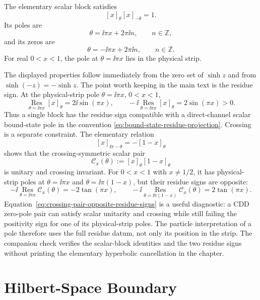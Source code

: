 \begin{remark}
\label{rem:elementary-scalar-block-algebra}
The elementary scalar block satisfies
\[
  [x]_{\theta}[x]_{-\theta}=1.
\]
Its poles are
\[
  \theta=\ii\pi x+2\pi\ii n,\qquad n\in\mathbb Z,
\]
and its zeros are
\[
  \theta=-\ii\pi x+2\pi\ii n,\qquad n\in\mathbb Z .
\]
For real \(0<x<1\), the pole at \(\theta=\ii\pi x\) lies in the physical
strip.
\end{remark}

The displayed properties follow immediately from the zero set of
\(\sinh z\) and from \(\sinh(-z)=-\sinh z\).  The point worth keeping in the
main text is the residue sign.  At the physical-strip pole
\(\theta=\ii\pi x\), \(0<x<1\),
\[
  \operatorname*{Res}_{\theta=\ii\pi x}[x]_\theta
  =
  2\ii\sin(\pi x),
  \qquad
  -\ii\operatorname*{Res}_{\theta=\ii\pi x}[x]_\theta
  =
  2\sin(\pi x)>0 .
\]
Thus a single block has the residue sign compatible with a direct-channel
scalar bound-state pole in the convention
\eqref{eq:bound-state-residue-projection}.  Crossing is a separate
constraint.  The elementary relation
\[
  [x]_{\ii\pi-\theta}=-[1-x]_\theta
\]
shows that the crossing-symmetric scalar pair
\[
  \mathcal C_x(\theta):=[x]_\theta[1-x]_\theta
\]
is unitary and crossing invariant.  For \(0<x<1\) with \(x\ne1/2\), it has
physical-strip poles at \(\theta=\ii\pi x\) and
\(\theta=\ii\pi(1-x)\), but their residue signs are opposite:
\begin{equation}
  -\ii\operatorname*{Res}_{\theta=\ii\pi x}\mathcal C_x(\theta)
  =
  -2\tan(\pi x),
  \qquad
  -\ii\operatorname*{Res}_{\theta=\ii\pi(1-x)}\mathcal C_x(\theta)
  =
  2\tan(\pi x).
  \label{eq:crossing-pair-opposite-residue-signs}
\end{equation}
Equation~\eqref{eq:crossing-pair-opposite-residue-signs} is a useful
diagnostic: a CDD zero-pole pair can satisfy scalar unitarity and crossing
while still failing the positivity sign for one of its physical-strip poles.
The particle interpretation of a pole therefore uses the full residue datum,
not only its position in the strip.  The companion check
 verifies
the scalar-block identities and the two residue signs without printing the
elementary hyperbolic cancellation in the chapter.

\section{Hilbert-Space Boundary}

